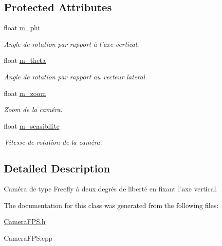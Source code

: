 \subsection*{Protected Attributes}
\begin{DoxyCompactItemize}
\item 
\hypertarget{classCameraFPS_adea819c2cc3cbe4d12153e18a61eef4d}{float \hyperlink{classCameraFPS_adea819c2cc3cbe4d12153e18a61eef4d}{m\-\_\-phi}}\label{classCameraFPS_adea819c2cc3cbe4d12153e18a61eef4d}

\begin{DoxyCompactList}\small\item\em Angle de rotation par rapport à l'axe vertical. \end{DoxyCompactList}\item 
\hypertarget{classCameraFPS_a9980f2a325bf21f2bbadf3d3caceebc5}{float \hyperlink{classCameraFPS_a9980f2a325bf21f2bbadf3d3caceebc5}{m\-\_\-theta}}\label{classCameraFPS_a9980f2a325bf21f2bbadf3d3caceebc5}

\begin{DoxyCompactList}\small\item\em Angle de rotation par rapport au vecteur lateral. \end{DoxyCompactList}\item 
\hypertarget{classCameraFPS_af473984bd2b269434960ec381b59682c}{float \hyperlink{classCameraFPS_af473984bd2b269434960ec381b59682c}{m\-\_\-zoom}}\label{classCameraFPS_af473984bd2b269434960ec381b59682c}

\begin{DoxyCompactList}\small\item\em Zoom de la caméra. \end{DoxyCompactList}\item 
\hypertarget{classCameraFPS_acf2f083c8757a1571165f4e8b6d3feba}{float \hyperlink{classCameraFPS_acf2f083c8757a1571165f4e8b6d3feba}{m\-\_\-sensibilite}}\label{classCameraFPS_acf2f083c8757a1571165f4e8b6d3feba}

\begin{DoxyCompactList}\small\item\em Vitesse de rotation de la caméra. \end{DoxyCompactList}\end{DoxyCompactItemize}


\subsection{Detailed Description}
Caméra de type Freefly à deux degrés de liberté en fixant l'axe vertical. 

The documentation for this class was generated from the following files\-:\begin{DoxyCompactItemize}
\item 
\hyperlink{CameraFPS_8h}{Camera\-F\-P\-S.\-h}\item 
Camera\-F\-P\-S.\-cpp\end{DoxyCompactItemize}
